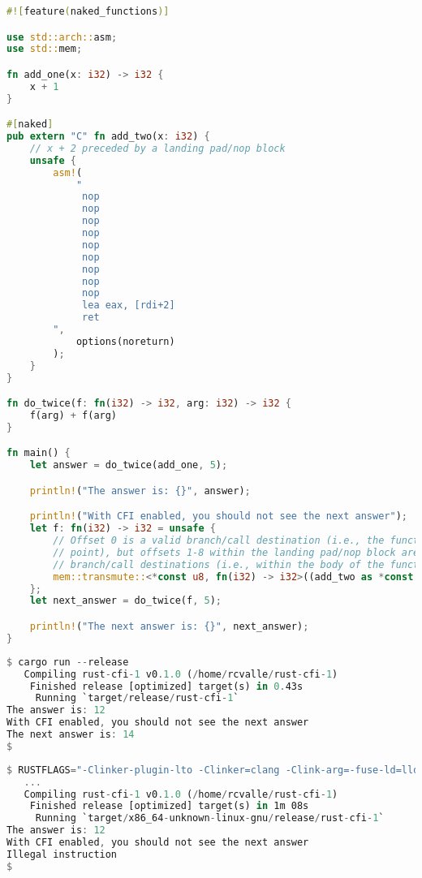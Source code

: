 \documentclass{article}
\begin{document}
\begin{lstlisting}[language=Rust, caption={Redirecting control flow using an indirect branch/call to an invalid destination (i.e., within the body of the function).}]
#![feature(naked_functions)]

use std::arch::asm;
use std::mem;

fn add_one(x: i32) -> i32 {
    x + 1
}

#[naked]
pub extern "C" fn add_two(x: i32) {
    // x + 2 preceded by a landing pad/nop block
    unsafe {
        asm!(
            "
             nop
             nop
             nop
             nop
             nop
             nop
             nop
             nop
             nop
             lea eax, [rdi+2]
             ret
        ",
            options(noreturn)
        );
    }
}

fn do_twice(f: fn(i32) -> i32, arg: i32) -> i32 {
    f(arg) + f(arg)
}

fn main() {
    let answer = do_twice(add_one, 5);

    println!("The answer is: {}", answer);

    println!("With CFI enabled, you should not see the next answer");
    let f: fn(i32) -> i32 = unsafe {
        // Offset 0 is a valid branch/call destination (i.e., the function entry
        // point), but offsets 1-8 within the landing pad/nop block are invalid
        // branch/call destinations (i.e., within the body of the function).
        mem::transmute::<*const u8, fn(i32) -> i32>((add_two as *const u8).offset(5))
    };
    let next_answer = do_twice(f, 5);

    println!("The next answer is: {}", next_answer);
}
\end{lstlisting}

\begin{lstlisting}[language=Rust, caption={Build and execution of Fig. 8 with LLVM CFI disabled.}]
$ cargo run --release
   Compiling rust-cfi-1 v0.1.0 (/home/rcvalle/rust-cfi-1)
    Finished release [optimized] target(s) in 0.43s
     Running `target/release/rust-cfi-1`
The answer is: 12
With CFI enabled, you should not see the next answer
The next answer is: 14
$
\end{lstlisting}

\begin{lstlisting}[language=Rust, caption={Build and execution of Fig. 8 with LLVM CFI enabled.}]
$ RUSTFLAGS="-Clinker-plugin-lto -Clinker=clang -Clink-arg=-fuse-ld=lld -Zsanitizer=cfi" cargo run -Zbuild-std -Zbuild-std-features --release --target x86_64-unknown-linux-gnu
   ...
   Compiling rust-cfi-1 v0.1.0 (/home/rcvalle/rust-cfi-1)
    Finished release [optimized] target(s) in 1m 08s
     Running `target/x86_64-unknown-linux-gnu/release/rust-cfi-1`
The answer is: 12
With CFI enabled, you should not see the next answer
Illegal instruction
$
\end{lstlisting}
\end{document}
